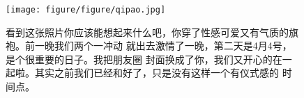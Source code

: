 \documentclass[cn,11pt,chinese]{elegantbook}
\begin{document}
\begin{figure}
    \texttt{[image: figure/figure/qipao.jpg]}
    \caption{看到这张照片你应该能想起来什么吧，你穿了性感可爱又有气质的旗袍。前一晚我们两个一冲动
    就出去激情了一晚，第二天是4月4号，是个很重要的日子。我把朋友圈
    封面换成了你，我们又开心的在一起啦。其实之前我们已经和好了，只是没有这样一个有仪式感的
    时间点。}
\end{figure}
\begin{figure}

\end{figure}
\end{document}

